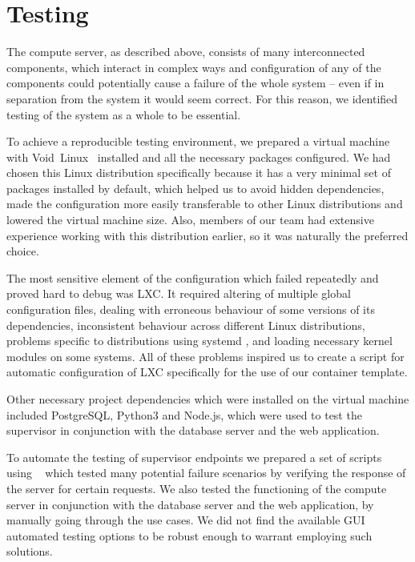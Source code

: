 \section{Testing}

The compute server, as described above, consists of many interconnected
components, which interact in complex ways and configuration of any of the
components could potentially cause a failure of the whole system -- even if in
separation from the system it would seem correct. For this reason, we identified
testing of the system as a whole to be essential.

To achieve a reproducible testing environment, we prepared a virtual machine
with Void~Linux~\cite{voidlinux} installed and all the necessary packages
configured. We had chosen this Linux distribution specifically because it has a
very minimal set of packages installed by default, which helped us to avoid
hidden dependencies, made the configuration more easily transferable to other
Linux distributions and lowered the virtual machine size. Also, members of our
team had extensive experience working with this distribution earlier, so it was
naturally the preferred choice.

The most sensitive element of the configuration which failed repeatedly and
proved hard to debug was LXC. It required altering of multiple global
configuration files, dealing with erroneous behaviour of some versions of its
dependencies, inconsistent behaviour across different Linux distributions,
problems specific to distributions using systemd \cite{systemd}, and loading
necessary kernel modules on some systems. All of these problems inspired us to
create a script for automatic configuration of LXC specifically for the use of
our container template.

Other necessary project dependencies which were installed on the virtual
machine included PostgreSQL, Python3 and Node.js, which were used to test the
supervisor in conjunction with the database server and the web application.

To automate the testing of supervisor endpoints we prepared a set of
scripts using ~\cite{curl} which tested many potential failure
scenarios by verifying the response of the server for certain requests. We also
tested the functioning of the compute server in conjunction with the database
server and the web application, by manually going through the use cases. We did
not find the available GUI automated testing options to be robust enough to
warrant employing such solutions.


